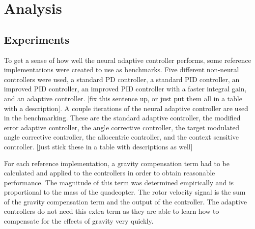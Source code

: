 \documentclass[letterpaper,12pt,titlepage,oneside,final]{book}
\begin{document}
\chapter{Analysis} \label{chap:analysis}

\section{Experiments}


To get a sense of how well the neural adaptive controller performs, some reference implementations were created to use as benchmarks. 
Five different non-neural controllers were used, a standard PD controller, a standard PID controller, an improved PID controller, an improved PID controller with a faster integral gain, and an adaptive controller. [fix this sentence up, or just put them all in a table with a description].
A couple iterations of the neural adaptive controller are used in the benchmarking. 
These are the standard adaptive controller, the modified error adaptive controller, the angle corrective controller, the target modulated angle corrective controller, the allocentric controller, and the context sensitive controller. [just stick these in a table with descriptions as well]


For each reference implementation, a gravity compensation term had to be calculated and applied to the controllers in order to obtain reasonable performance. 
The magnitude of this term was determined empirically and is proportional to the mass of the quadcopter. 
The rotor velocity signal is the sum of the gravity compensation term and the output of the controller.
The adaptive controllers do not need this extra term as they are able to learn how to compensate for the effects of gravity very quickly.
\end{document}
